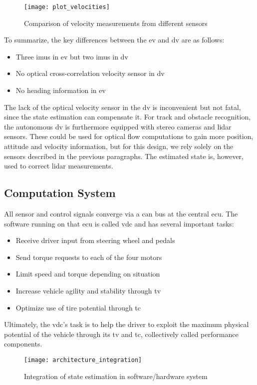 \begin{figure}
	\centering
	\texttt{[image: plot\_velocities]}%
	\caption{Comparison of velocity measurements from different sensors}
	\label{fig:velocities}
\end{figure}

To summarize, the key differences between the \gls{ev} and \gls{dv} are as follows:
\begin{itemize}
\item Three \glspl{imu} in \gls{ev} but two \glspl{imu} in \gls{dv}
\item No optical cross-correlation velocity sensor in \gls{dv}
\item No heading information in \gls{ev}
\end{itemize}
The lack of the optical velocity sensor in the \gls{dv} is inconvenient but not fatal, since the state estimation can compensate it. For track and obstacle recognition, the autonomous \gls{dv} is furthermore equipped with stereo cameras and lidar sensors. These could be used for optical flow computations to gain more position, attitude and velocity information, but for this design, we rely solely on the sensors described in the previous paragraphs. The estimated state is, however, used to correct lidar measurements.


\subsection{Computation System}\label{sec:design-computation-system}
All sensor and control signals converge via a \gls{can} bus at the central \gls{ecu}. The software running on that \gls{ecu} is called \gls{vdc} and has several important tasks:
\begin{itemize}
\item Receive driver input from steering wheel and pedals
\item Send torque requests to each of the four motors
\item Limit speed and torque depending on situation
\item Increase vehicle agility and stability through \gls{tv}
\item Optimize use of tire potential through \gls{tc}
\end{itemize}
Ultimately, the \gls{vdc}'s task is to help the driver to exploit the maximum physical potential of the vehicle through its \gls{tv} and \gls{tc}, collectively called performance components.

\begin{figure}
	\centering
	\texttt{[image: architecture\_integration]}%
	\caption{Integration of state estimation in software/hardware system}
	\label{fig:architecture-integration}
\end{figure}

